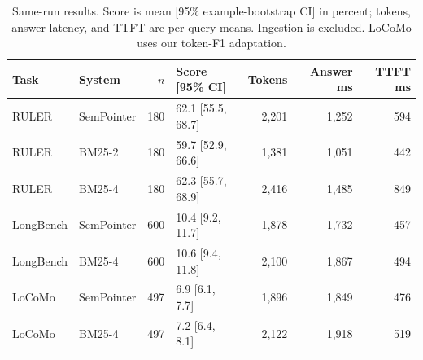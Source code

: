\begin{table}[t]
\centering
\scriptsize
\setlength{\tabcolsep}{3pt}
\caption{Same-run results. Score is mean [95\% example-bootstrap CI] in percent; tokens, answer latency, and TTFT are per-query means. Ingestion is excluded. LoCoMo uses our token-F1 adaptation.}
\label{tab:main}
\begin{tabular}{llrlrrr}
\toprule
Task & System & $n$ & Score [95\% CI] & Tokens & Answer ms & TTFT ms \\
\midrule
RULER & SemPointer & 180 & 62.1 [55.5, 68.7] & 2,201 & 1,252 & 594 \\
RULER & BM25-2 & 180 & 59.7 [52.9, 66.6] & 1,381 & 1,051 & 442 \\
RULER & BM25-4 & 180 & 62.3 [55.7, 68.9] & 2,416 & 1,485 & 849 \\
LongBench & SemPointer & 600 & 10.4 [9.2, 11.7] & 1,878 & 1,732 & 457 \\
LongBench & BM25-4 & 600 & 10.6 [9.4, 11.8] & 2,100 & 1,867 & 494 \\
LoCoMo & SemPointer & 497 & 6.9 [6.1, 7.7] & 1,896 & 1,849 & 476 \\
LoCoMo & BM25-4 & 497 & 7.2 [6.4, 8.1] & 2,122 & 1,918 & 519 \\
\bottomrule
\end{tabular}
\end{table}
